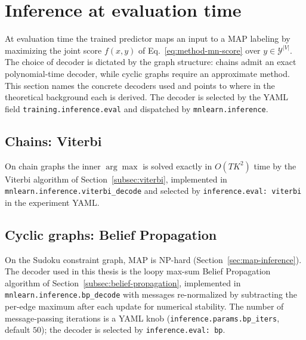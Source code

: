 \section{Inference at evaluation time}
\label{sec:method-inference}

At evaluation time the trained predictor maps an input to a
MAP labeling by maximizing the joint score
$f(x, y)$ of Eq.~\eqref{eq:method-mn-score} over
$y \in \mathcal{Y}^{|V|}$. The choice of decoder is dictated
by the graph structure: chains admit an exact polynomial-time
decoder, while cyclic graphs require an approximate method.
This section names the concrete decoders used and points to
where in the theoretical background each is derived. The
decoder is selected by the YAML field
\texttt{training.inference.eval} and dispatched by
\texttt{mnlearn.inference}.

\subsection{Chains: Viterbi}
\label{subsec:method-inference-viterbi}

On chain graphs the inner $\arg\max$ is solved exactly in
$O(T K^{2})$ time by the Viterbi algorithm of
Section~\ref{subsec:viterbi}, implemented in
\texttt{mnlearn.inference.viterbi\_decode} and selected by
\texttt{inference.eval: viterbi} in the experiment YAML.

\subsection{Cyclic graphs: Belief Propagation}
\label{subsec:method-inference-cyclic}

On the Sudoku constraint graph, MAP is NP-hard
(Section~\ref{sec:map-inference}). The decoder used in this
thesis is the loopy max-sum Belief Propagation algorithm of
Section~\ref{subsec:belief-propagation}, implemented in
\texttt{mnlearn.inference.bp\_decode} with messages re-normalized
by subtracting the per-edge maximum after each update for
numerical stability. The number of message-passing iterations is
a YAML knob (\texttt{inference.params.bp\_iters}, default $50$);
the decoder is selected by \texttt{inference.eval: bp}.